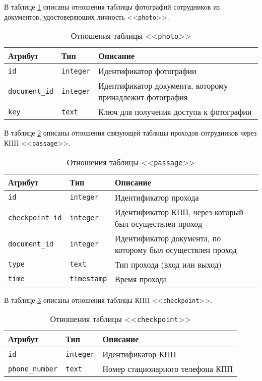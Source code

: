 В таблице \ref{table:photoCols} описаны отношения таблицы фотографий сотрудников из документов, удостоверяющих личность <<\texttt{photo}>>.
\begin{table}[h!]
	\begin{center}
		\caption{\label{table:photoCols} Отношения таблицы <<\texttt{photo}>>}
		\begin{tabularx}{\textwidth}{|X|X|X|}
			\hline
			Атрибут & Тип & Описание \\ \hline
			\texttt{id} & \texttt{integer} & Идентификатор фотографии \\ \hline
			\texttt{document\_id} & \texttt{integer} & Идентификатор документа, которому принадлежит фотография \\ \hline
			\texttt{key} & \texttt{text} & Ключ для получения доступа к фотографии \\ \hline
		\end{tabularx}
	\end{center}
\end{table}

\clearpage

В таблице \ref{table:passageCols} описаны отношения связующей таблицы проходов сотрудников через КПП <<\texttt{passage}>>.
\begin{table}[h!]
	\begin{center}
		\caption{\label{table:passageCols} Отношения таблицы <<\texttt{passage}>>}
		\begin{tabularx}{\textwidth}{|X|X|X|}
			\hline
			Атрибут & Тип & Описание \\ \hline
			\texttt{id} & \texttt{integer} & Идентификатор прохода \\ \hline
			\texttt{checkpoint\_id} & \texttt{integer} & Идентификатор КПП, через который был осуществлен проход \\ \hline
			\texttt{document\_id} & \texttt{integer} & Идентификатор документа, по которому был осуществлен проход \\ \hline
			\texttt{type} & \texttt{text} & Тип прохода (вход или выход) \\ \hline
			\texttt{time} & \texttt{timestamp} & Время прохода \\ \hline
		\end{tabularx}
	\end{center}
\end{table}

В таблице \ref{table:checkpointCols} описаны отношения таблицы КПП <<\texttt{checkpoint}>>.
\begin{table}[h!]
	\begin{center}
		\caption{\label{table:checkpointCols} Отношения таблицы <<\texttt{checkpoint}>>}
		\begin{tabularx}{\textwidth}{|X|X|X|}
			\hline
			Атрибут & Тип & Описание \\ \hline
			\texttt{id} & \texttt{integer} & Идентификатор КПП \\ \hline
			\texttt{phone\_number} & \texttt{text} & Номер стационарного телефона КПП \\ \hline
		\end{tabularx}
	\end{center}
\end{table}


